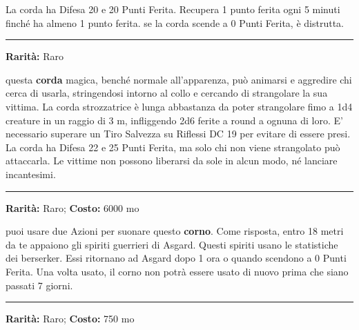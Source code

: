 \begin{multicols}{2}
La corda ha Difesa 20 e 20 Punti Ferita. Recupera 1 punto ferita ogni 5 minuti finché ha almeno 1 punto ferita. se la corda scende a 0 Punti Ferita, è distrutta.

\smallskip\noindent\rule{\linewidth}{2pt}  \hypertarget{CordaStrozzatrice}{}\medskip{}\noindent\label{CordaStrozzatrice}

\textbf{Rarità:} Raro

questa \textbf{corda} magica, benché normale all'apparenza, può animarsi e aggredire chi cerca di usarla, stringendosi intorno al collo e cercando di strangolare la sua vittima. La corda strozzatrice è lunga abbastanza da poter strangolare fimo a 1d4 creature in un raggio di 3 m, infliggendo 2d6 ferite a round a ognuna di loro. E' necessario superare un Tiro Salvezza su Riflessi DC 19 per evitare di essere presi. La corda ha Difesa 22 e 25 Punti Ferita, ma solo chi non viene strangolato può attaccarla. Le vittime non possono liberarsi da sole in alcun modo, né lanciare incantesimi.

\smallskip\noindent\rule{\linewidth}{2pt}  \hypertarget{CornodelValhalla}{}\medskip{}\noindent\label{CornodelValhalla}

\textbf{Rarità:} Raro; \textbf{Costo:} 6000 mo

puoi usare due Azioni per suonare questo \textbf{corno}. Come risposta, entro 18 metri da te appaiono gli spiriti guerrieri di Asgard. Questi spiriti usano le statistiche dei berserker. Essi ritornano ad Asgard dopo 1 ora o quando scendono a 0 Punti Ferita. Una volta usato, il corno non potrà essere usato di nuovo prima che siano passati 7 giorni.




\smallskip\noindent\rule{\linewidth}{2pt}  \hypertarget{CornodiDistruzione}{}\medskip{}\noindent\label{CornodiDistruzione}

\textbf{Rarità:} Raro; \textbf{Costo:} 750 mo


\end{multicols}
